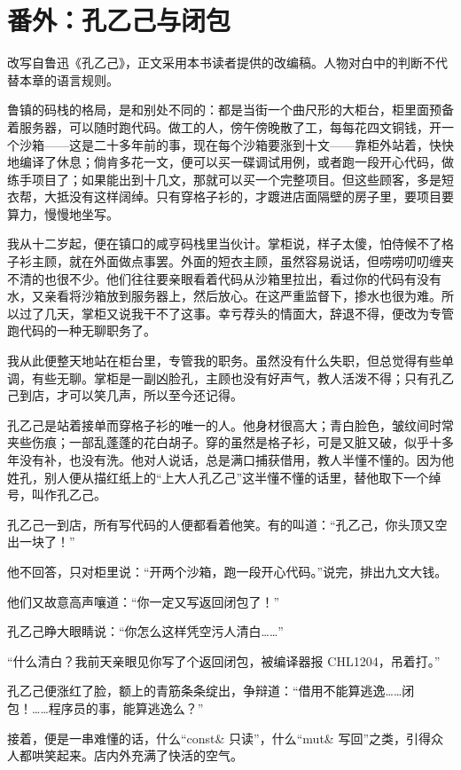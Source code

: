 \section{番外：孔乙己与闭包}

改写自鲁迅《孔乙己》，正文采用本书读者提供的改编稿。人物对白中的判断不代替本章的语言规则。

鲁镇的码栈的格局，是和别处不同的：都是当街一个曲尺形的大柜台，柜里面预备着服务器，可以随时跑代码。做工的人，傍午傍晚散了工，每每花四文铜钱，开一个沙箱——这是二十多年前的事，现在每个沙箱要涨到十文——靠柜外站着，快快地编译了休息；倘肯多花一文，便可以买一碟调试用例，或者跑一段开心代码，做练手项目了；如果能出到十几文，那就可以买一个完整项目。但这些顾客，多是短衣帮，大抵没有这样阔绰。只有穿格子衫的，才踱进店面隔壁的房子里，要项目要算力，慢慢地坐写。

我从十二岁起，便在镇口的咸亨码栈里当伙计。掌柜说，样子太傻，怕侍候不了格子衫主顾，就在外面做点事罢。外面的短衣主顾，虽然容易说话，但唠唠叨叨缠夹不清的也很不少。他们往往要亲眼看着代码从沙箱里拉出，看过你的代码有没有水，又亲看将沙箱放到服务器上，然后放心。在这严重监督下，掺水也很为难。所以过了几天，掌柜又说我干不了这事。幸亏荐头的情面大，辞退不得，便改为专管跑代码的一种无聊职务了。

我从此便整天地站在柜台里，专管我的职务。虽然没有什么失职，但总觉得有些单调，有些无聊。掌柜是一副凶脸孔，主顾也没有好声气，教人活泼不得；只有孔乙己到店，才可以笑几声，所以至今还记得。

孔乙己是站着接单而穿格子衫的唯一的人。他身材很高大；青白脸色，皱纹间时常夹些伤痕；一部乱蓬蓬的花白胡子。穿的虽然是格子衫，可是又脏又破，似乎十多年没有补，也没有洗。他对人说话，总是满口捕获借用，教人半懂不懂的。因为他姓孔，别人便从描红纸上的“上大人孔乙己”这半懂不懂的话里，替他取下一个绰号，叫作孔乙己。

孔乙己一到店，所有写代码的人便都看着他笑。有的叫道：“孔乙己，你头顶又空出一块了！”

他不回答，只对柜里说：“开两个沙箱，跑一段开心代码。”说完，排出九文大钱。

他们又故意高声嚷道：“你一定又写返回闭包了！”

孔乙己睁大眼睛说：“你怎么这样凭空污人清白……”

“什么清白？我前天亲眼见你写了个返回闭包，被编译器报 CHL1204，吊着打。”

孔乙己便涨红了脸，额上的青筋条条绽出，争辩道：“借用不能算逃逸……闭包！……程序员的事，能算逃逸么？”

接着，便是一串难懂的话，什么“const\& 只读”，什么“mut\& 写回”之类，引得众人都哄笑起来。店内外充满了快活的空气。

